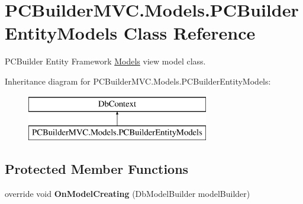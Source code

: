 \hypertarget{class_p_c_builder_m_v_c_1_1_models_1_1_p_c_builder_entity_models}{}\section{P\+C\+Builder\+M\+V\+C.\+Models.\+P\+C\+Builder\+Entity\+Models Class Reference}
\label{class_p_c_builder_m_v_c_1_1_models_1_1_p_c_builder_entity_models}


P\+C\+Builder Entity Framework \hyperlink{namespace_p_c_builder_m_v_c_1_1_models}{Models} view model class.  


Inheritance diagram for P\+C\+Builder\+M\+V\+C.\+Models.\+P\+C\+Builder\+Entity\+Models\+:\begin{figure}[H]
\begin{center}
\leavevmode
\includegraphics[height=2.000000cm]{class_p_c_builder_m_v_c_1_1_models_1_1_p_c_builder_entity_models}
\end{center}
\end{figure}
\subsection*{Protected Member Functions}
\begin{DoxyCompactItemize}
\item 
override void {\bfseries On\+Model\+Creating} (Db\+Model\+Builder model\+Builder)\hypertarget{class_p_c_builder_m_v_c_1_1_models_1_1_p_c_builder_entity_models_a6f1980dd854d63223c69a6b1fd948f74}{}\label{class_p_c_builder_m_v_c_1_1_models_1_1_p_c_builder_entity_models_a6f1980dd854d63223c69a6b1fd948f74}

\end{DoxyCompactItemize}
